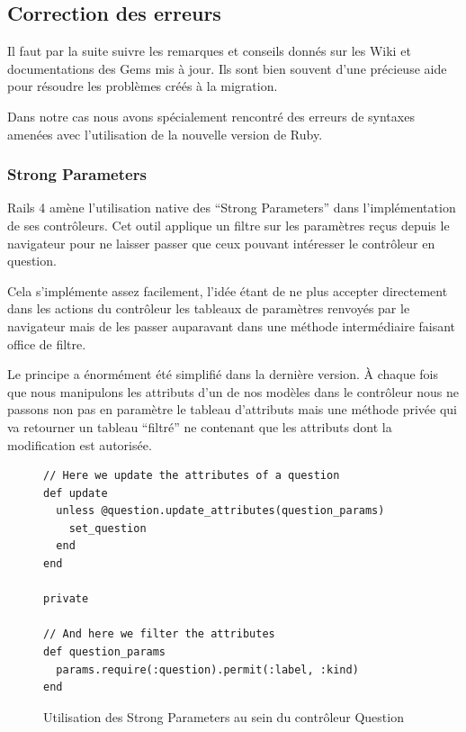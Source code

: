 \documentclass[12pt,a4paper]{book}
\begin{document}
\subsection{Correction des erreurs}

Il faut par la suite suivre les remarques et conseils donnés sur les Wiki et documentations des Gems mis à jour. Ils sont bien souvent d'une précieuse aide pour résoudre les problèmes créés à la migration. 

Dans notre cas nous avons spécialement rencontré des erreurs de syntaxes amenées avec l'utilisation de la nouvelle version de Ruby.

\subsubsection{Strong Parameters}

Rails 4 amène l'utilisation native des ``Strong Parameters'' dans l'implémentation de ses contrôleurs. Cet outil applique un filtre sur les paramètres reçus depuis le navigateur pour ne laisser passer que ceux pouvant intéresser le contrôleur en question.

Cela s'implémente assez facilement, l'idée étant de ne plus accepter directement dans les actions du contrôleur les tableaux de paramètres renvoyés par le navigateur mais de les passer auparavant dans une méthode intermédiaire faisant office de filtre.

Le principe a énormément été simplifié dans la dernière version. À chaque fois que nous manipulons les attributs d'un de nos modèles dans le contrôleur nous ne passons non pas en paramètre le tableau d'attributs mais une méthode privée qui va retourner un tableau ``filtré'' ne contenant que les attributs dont la modification est autorisée.

    \begin{figure}[h]
    \lstset{language=ruby}
    \begin{lstlisting}
// Here we update the attributes of a question
def update
  unless @question.update_attributes(question_params)
    set_question
  end
end

private

// And here we filter the attributes 
def question_params
  params.require(:question).permit(:label, :kind)
end
    \end{lstlisting}
     \caption{Utilisation des Strong Parameters au sein du contrôleur Question}
    \end{figure}
    
\end{document}
